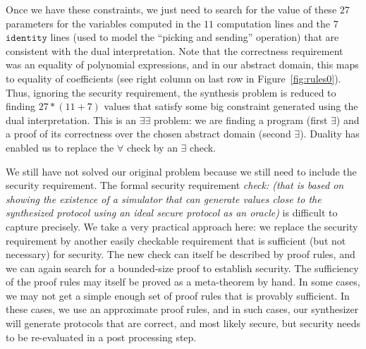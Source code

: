 \documentclass[preprint]{sig-alternate-05-2015}
\begin{document}
Once we have these constraints, we just need to
search for the value of these $27$ parameters for the 
variables computed in the 
$11$ computation lines and the $7$ $\mathtt{identity}$ lines (used to model
the ``picking and sending'' operation) that are consistent with the
dual interpretation.
Note that the correctness 
requirement was an equality of polynomial expressions, and in our
abstract domain, this maps to equality of coefficients 
(see right column on last row in Figure~\ref{fig:rules0}).
Thus, ignoring the security requirement, 
the synthesis problem is reduced to finding
$27*(11+7)$ values that satisfy some big constraint generated 
using the dual interpretation.  This is an $\exists\exists$ problem:
we are finding a program (first $\exists$) and a proof of its correctness over
the chosen abstract domain (second $\exists$).
Duality has enabled us to replace the $\forall$ check by an 
$\exists$ check.

We still have not solved our original problem because we still need to
include the security requirement.  The formal security requirement
{\em{check: (that is based on showing the existence of a simulator that can generate
values close to the synthesized protocol using an ideal secure protocol
as an oracle)}} is difficult to capture precisely. 
We take a very practical approach here:  we replace the security requirement
by another easily checkable requirement that is sufficient (but not necessary)
for security.  The new check can itself be described by 
proof rules, and we can again search for a bounded-size proof
to establish security.
The sufficiency of the proof rules may itself be proved as a 
meta-theorem by hand.  In some cases, we may not get a simple 
enough set of proof rules that is
provably sufficient. In these cases, we use an approximate proof
rules, and in 
such cases, our synthesizer will generate protocols that are correct, and most
likely secure, but security needs to be re-evaluated in a post processing step.
\end{document}
